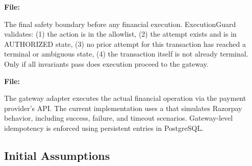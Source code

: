 \begin{tcolorbox}[featurebox={Step 5: ExecutionGuard}]
\textbf{File:} 

The final safety boundary before any financial execution. ExecutionGuard validates: (1) the action is in the allowlist, (2) the attempt exists and is in AUTHORIZED state, (3) no prior attempt for this transaction has reached a terminal or ambiguous state, (4) the transaction itself is not already terminal. Only if all invariants pass does execution proceed to the gateway.
\end{tcolorbox}

\begin{tcolorbox}[featurebox={Step 6: Gateway Execution}]
\textbf{File:} 

The gateway adapter executes the actual financial operation via the payment provider's API. The current implementation uses a  that simulates Razorpay behavior, including success, failure, and timeout scenarios. Gateway-level idempotency is enforced using persistent  entries in PostgreSQL.
\end{tcolorbox}

\vspace{0.5cm}

\subsection{Initial Assumptions}

